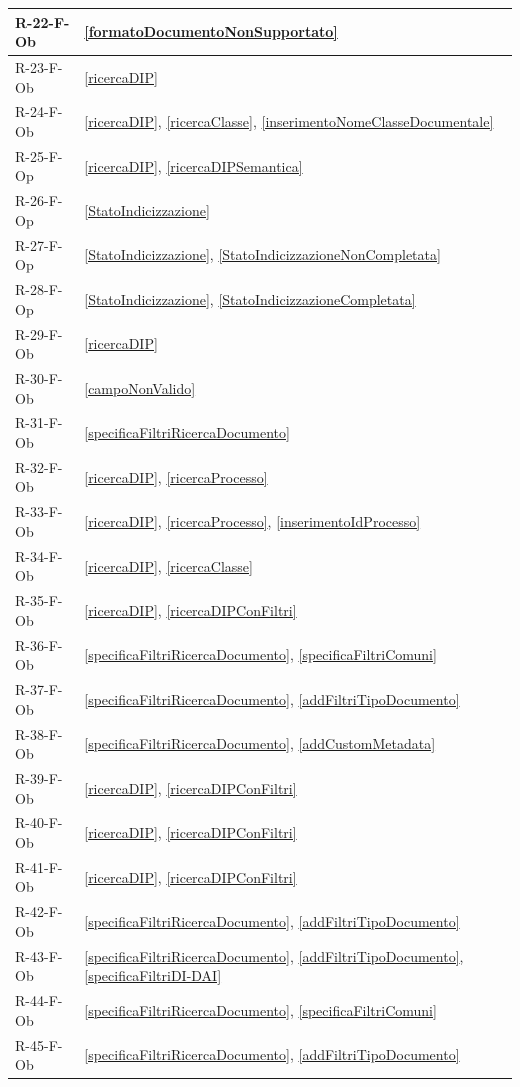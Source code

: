 \begin{longtable}{|p{4cm}|p{10cm}|}
\hline
R-22-F-Ob & \ref{formatoDocumentoNonSupportato} \\
\hline
R-23-F-Ob & \ref{ricercaDIP} \\
\hline
R-24-F-Ob & \ref{ricercaDIP}, \ref{ricercaClasse}, \ref{inserimentoNomeClasseDocumentale} \\
\hline
R-25-F-Op & \ref{ricercaDIP}, \ref{ricercaDIPSemantica} \\
\hline
R-26-F-Op & \ref{StatoIndicizzazione} \\
\hline
R-27-F-Op & \ref{StatoIndicizzazione}, \ref{StatoIndicizzazioneNonCompletata} \\
\hline
R-28-F-Op & \ref{StatoIndicizzazione}, \ref{StatoIndicizzazioneCompletata} \\
\hline
R-29-F-Ob & \ref{ricercaDIP} \\
\hline
R-30-F-Ob & \ref{campoNonValido} \\
\hline
R-31-F-Ob & \ref{specificaFiltriRicercaDocumento} \\
\hline
R-32-F-Ob & \ref{ricercaDIP}, \ref{ricercaProcesso} \\
\hline
R-33-F-Ob & \ref{ricercaDIP}, \ref{ricercaProcesso}, \ref{inserimentoIdProcesso} \\
\hline
R-34-F-Ob & \ref{ricercaDIP}, \ref{ricercaClasse} \\
\hline
R-35-F-Ob & \ref{ricercaDIP}, \ref{ricercaDIPConFiltri} \\
\hline
R-36-F-Ob & \ref{specificaFiltriRicercaDocumento}, \ref{specificaFiltriComuni} \\
\hline
R-37-F-Ob & \ref{specificaFiltriRicercaDocumento}, \ref{addFiltriTipoDocumento} \\
\hline
R-38-F-Ob & \ref{specificaFiltriRicercaDocumento}, \ref{addCustomMetadata} \\
\hline
R-39-F-Ob & \ref{ricercaDIP}, \ref{ricercaDIPConFiltri} \\
\hline
R-40-F-Ob & \ref{ricercaDIP}, \ref{ricercaDIPConFiltri} \\
\hline
R-41-F-Ob & \ref{ricercaDIP}, \ref{ricercaDIPConFiltri} \\
\hline
R-42-F-Ob & \ref{specificaFiltriRicercaDocumento}, \ref{addFiltriTipoDocumento} \\
\hline
R-43-F-Ob & \ref{specificaFiltriRicercaDocumento}, \ref{addFiltriTipoDocumento}, \ref{specificaFiltriDI-DAI} \\
\hline
R-44-F-Ob & \ref{specificaFiltriRicercaDocumento}, \ref{specificaFiltriComuni} \\
\hline
R-45-F-Ob & \ref{specificaFiltriRicercaDocumento}, \ref{addFiltriTipoDocumento} \\

\end{longtable}
